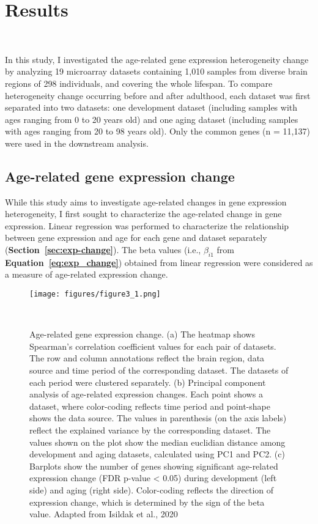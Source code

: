 \chapter{Results}~\label{chp:b3}

In this study, I investigated the age-related gene expression heterogeneity change by analyzing 19 microarray datasets
containing 1,010 samples from diverse brain regions of 298 individuals, and covering the whole lifespan.
To compare heterogeneity change occurring before and after adulthood, each dataset was first separated into two datasets: one development dataset 
(including samples with ages ranging from 0 to 20 years old) and one aging dataset (including samples with ages ranging from 20 to 98 years old).
Only the common genes (n = 11,137) were used in the downstream analysis.

\section{Age-related gene expression change}
While this study aims to investigate age-related changes in gene expression heterogeneity, I first sought to characterize the age-related change in gene expression.
Linear regression was performed to characterize the relationship between gene expression and age for each gene and dataset separately (\textbf{Section~\ref{sec:exp-change}}).
The beta values (i.e., $\beta_{i1}$ from \textbf{Equation~\ref{eq:exp_change}}) obtained from linear regression were considered as a measure of age-related expression change.

\begin{figure}[h]
    \centering
    \texttt{[image: figures/figure3\_1.png]}
    \caption{Age-related gene expression change. 
    (a) The heatmap shows Spearman's correlation coefficient values for each pair of datasets.
    The row and column annotations reflect the brain region, data source and time period of the corresponding dataset.
    The datasets of each period were clustered separately.
    (b) Principal component analysis of age-related expression changes. Each point shows a dataset, 
    where color-coding reflects time period and point-shape shows the data source. 
    The values in parenthesis (on the axis labels) reflect the explained variance by the corresponding dataset.
    The values shown on the plot show the median euclidian distance among development and aging datasets, 
    calculated using PC1 and PC2.
    (c) Barplots show the number of genes showing significant age-related expression change (FDR p-value < 0.05) during development (left side) and aging (right side).
    Color-coding reflects the direction of expression change, which is determined by the sign of the beta value.
    Adapted from Isildak et al., 2020
    }~\label{fig:fig3.1}
\end{figure}

